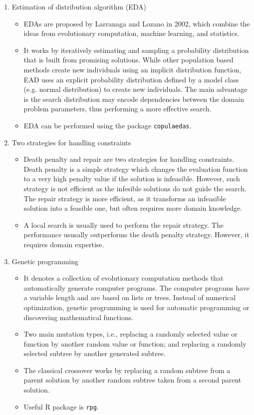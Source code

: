 \documentclass[12pt, a4paper]{article}
\begin{document}
\begin{enumerate}
 \item Estimation of distribution algorithm (EDA)
  \begin{itemize}
   \item EDAs are proposed by Larranaga and Lozano in 2002, which combine the ideas from evolutionary computation, machine learning, and statistics. 
   \item It works by iteratively estimating and sampling a probability distribution that is built from promising solutions. While other population based methods create new individuals using an implicit distribution function, EAD uses an explicit probability distribution defined by a model class (e.g. normal distribution) to create new individuals. The main advantage is the search distribution may encode dependencies between the domain problem parameters, thus performing a more effective search.
   \item EDA can be performed using the package \texttt{copulaedas}.
  \end{itemize}
 
 \item Two strategies for handling constraints
  \begin{itemize}
   \item Death penalty and repair are two strategies for handling constraints. Death penalty is a simple strategy which changes the evaluation function to a very high penalty value if the solution is infeasible. However, such strategy is not efficient as the infesible solutions do not guide the search. The repair strategy is more efficient, as it transforms an infeasible solution into a feasible one, but often requires more domain knowledge.
   \item A local search is usually used to perform the repair strategy. The performance ususally outperforms the death penalty strategy. However, it requires domain expertise.
  \end{itemize}
  
 \item Genetic programming
  \begin{itemize}
   \item It denotes a collection of evolutionary computation methods that automatically generate computer programs. The computer programs have a variable length and are based on lists or trees. Instead of numerical optimization, genetic programming is used for automatic programming or discovering mathematical functions.
   \item Two main mutation types, i.e., replacing a randomly selected value or function by another random value or function; and replacing a randomly selected subtree by another generated subtree. 
   \item The classical crossover works by replacing a random subtree from a parent solution by another random subtree taken from a second parent solution. 
   \item Useful R package is \texttt{rpg}.
  \end{itemize}

\end{enumerate}
\end{document}
